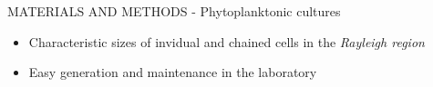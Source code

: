 \documentclass[handout]{beamer}
\newcommand\Fontable{\fontsize{9}{10}\selectfont}
\begin{document}
\begin{frame}{MATERIALS AND METHODS - Phytoplanktonic cultures}
\begin{minipage}[c]{1\linewidth}
\begin{minipage}[c]{0.7\linewidth}
\begin{itemize}
	\Fontable
	\item<3-> Characteristic sizes of invidual and chained cells in the \textit{Rayleigh region}
\end{itemize}
\end{minipage}
\begin{minipage}[c]{0.29\linewidth}
\end{minipage}
\end{minipage}

\begin{minipage}[c]{1\linewidth}
\begin{minipage}[c]{0.7\linewidth}
\begin{itemize}
	\Fontable
	\item<3-> Easy generation and maintenance in the laboratory
\end{itemize}
\end{minipage}
\begin{minipage}[c]{0.29\linewidth}
\end{minipage}
\end{minipage}


\end{frame}
\end{document}
